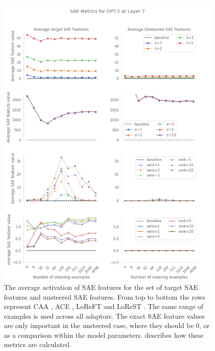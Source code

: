 \begin{figure}
    \centering
    \captionsetup{width=\textwidth}
    \includegraphics[width=\textwidth]{figures/gpt2_7_sae.png}
    \caption{
        The average activation of SAE features for the set of target SAE features and unsteered SAE features.
        From top to bottom the rows represent CAA \citep{caa}, ACE \citep{ace}, LoReFT \citep{reft} and LoReST \citep{steering-clear}.
        The same range of examples is used across all adaptors.
        The exact SAE feature values are only important in the unsteered case, where they should be 0, or as a comparison within the model parameters.
     describes how these metrics are calculated.}
    \label{fig:gpt-pp-sae}
\end{figure}

